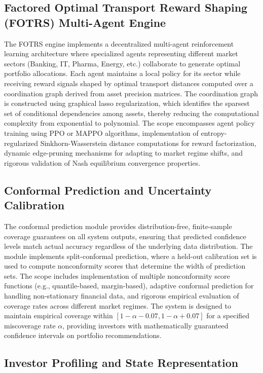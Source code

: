 \documentclass[12pt,a4paper,oneside]{report}
\theoremstyle{definition}
\theoremstyle{remark}
\begin{document}
\subsection{Factored Optimal Transport Reward Shaping (FOTRS) Multi-Agent Engine}

The FOTRS engine implements a decentralized multi-agent reinforcement learning architecture where specialized agents representing different market sectors (Banking, IT, Pharma, Energy, etc.) collaborate to generate optimal portfolio allocations. Each agent maintains a local policy for its sector while receiving reward signals shaped by optimal transport distances computed over a coordination graph derived from asset precision matrices. The coordination graph is constructed using graphical lasso regularization, which identifies the sparsest set of conditional dependencies among assets, thereby reducing the computational complexity from exponential to polynomial. The scope encompasses agent policy training using PPO or MAPPO algorithms, implementation of entropy-regularized Sinkhorn-Wasserstein distance computations for reward factorization, dynamic edge-pruning mechanisms for adapting to market regime shifts, and rigorous validation of Nash equilibrium convergence properties.

\subsection{Conformal Prediction and Uncertainty Calibration}

The conformal prediction module provides distribution-free, finite-sample coverage guarantees on all system outputs, ensuring that predicted confidence levels match actual accuracy regardless of the underlying data distribution. The module implements split-conformal prediction, where a held-out calibration set is used to compute nonconformity scores that determine the width of prediction sets. The scope includes implementation of multiple nonconformity score functions (e.g., quantile-based, margin-based), adaptive conformal prediction for handling non-stationary financial data, and rigorous empirical evaluation of coverage rates across different market regimes. The system is designed to maintain empirical coverage within $[1-\alpha-0.07, 1-\alpha+0.07]$ for a specified miscoverage rate $\alpha$, providing investors with mathematically guaranteed confidence intervals on portfolio recommendations.

\subsection{Investor Profiling and State Representation}
\end{document}
